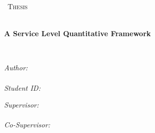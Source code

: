 \documentclass[
  12pt,
  letterpaper,
  12pt,
  oneside,
  english,
  onehalfspacing,
  headsepline]{MastersDoctoralThesis}
\author{Tobias Zeier}
\begin{document}
\frontmatter %

\pagestyle{plain} %


\begin{titlepage}
\begin{center}

\vspace*{.06\textheight}
{\scshape\LARGE \univname\par}\vspace{1.5cm} %
\textsc{\Large \degreename\ Thesis}\\[0.5cm] %

\HRule \\[0.4cm] %
{\LARGE \bfseries \ttitle\par}\vspace{0.2cm} %
{\normalsize\bfseries A Service Level Quantitative
Framework\par}\vspace{0.2cm} %
\HRule \\[1.5cm] %
 
\begin{minipage}[t]{0.4\textwidth}
\begin{flushleft} \normalsize
\emph{Author:}\\
\authorname\\[0.3cm]
\emph{Student ID:}\\
\thesistudentid
\end{flushleft}
\end{minipage}
\begin{minipage}[t]{0.4\textwidth}
\begin{flushright} \normalsize
\emph{Supervisor:} \\
%
\supname\\[0.3cm]

\emph{Co-Supervisor:}\\
\cosupname
\end{flushright}
\end{minipage}\\[3cm]
 
\vfill


\end{center}
\end{titlepage}
\end{document}
